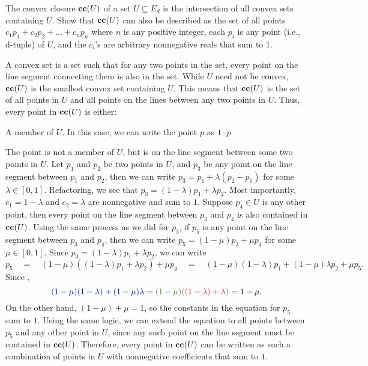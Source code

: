 \documentclass[11pt, reqno]{amsart}
\begin{document}
\newpage
\begin{problem}[15]
  The convex closure $\mathbf{cc}(U)$ of a set $U \subseteq E_d$
  is the intersection of all convex sets containing $U$. Show that $\mathbf{cc}(U)$
  can also be described as the set of all points $c_1 p_1 + c_2 p_2 + \ldots + c_n p_n$
  where $n$ is any positive integer, each $p_i$ is any point (i.e., d-tuple) of $U$,
  and the $c_i$'s are arbitrary nonnegative reals that sum to $1$.

  \step
  A convex set is a set such that for any two points in the set, every point on the line
  segment connecting them is also in the set.
  While $U$ need not be convex, $\mathbf{cc}(U)$ is the smallest convex set containing $U$.
  This means that $\mathbf{cc}(U)$ is the set of all points in $U$ and all points on the lines
  between any two points in $U$. Thus, every point in $\mathbf{cc}(U)$ is either:
  \begin{enumroman}
    \item A member of $U$. In this case, we can write the point $p$ as $1 \cdot p$.
    \item The point is not a member of $U$, but is on the line segment between some
      two points in $U$.
      Let $p_1$ and $p_2$ be two points in $U$, and $p_3$ be any point on the line segment
      between $p_1$ and $p_2$, then we can write $p_3 = p_1 + \lambda (p_2 - p_1)$ for some
      $\lambda \in [0,1]$.
      Refactoring, we see that $p_3 = (1 - \lambda) p_1 + \lambda p_2$. Most importantly,
      $c_1 = 1 - \lambda$ and $c_2 = \lambda$ are nonnegative and sum to $1$.
      Suppose $p_4 \in U$ is any other point, then every point on the line segment between
      $p_3$ and $p_4$ is also contained in $\mathbf{cc}(U)$. Using the same process as we did for $p_3$,
      if $p_5$ is any point on the line segment between $p_3$ and $p_4$, then we can write
      $p_5 = (1 - \mu) p_3 + \mu p_4$ for some $\mu \in [0,1]$. Since
      $p_3 = (1 - \lambda) p_1 + \lambda p_2$, we can write
      \[ p_5 \quad = 
        \quad (1 - \mu) ((1 - \lambda) p_1 + \lambda p_2) + \mu p_4 \quad =
        \quad (1 - \mu)(1 - \lambda) p_1 + (1 - \mu)\lambda p_2 + \mu p_5.
      \]
      Since ,
      \[ \zaff{(1 - \mu)(1 - \lambda) + (1 - \mu)\lambda} = \green{(1 - \mu)(\crim{(1 - \lambda) + \lambda})} = 1 - \mu. \]
      On the other hand, $(1 - \mu) + \mu = 1$, so the constants in the equation for $p_5$ sum to $1$.
      Using the same logic, we can extend the equation to all points between $p_5$ and any other point
      in $U$, since any such point on the line segment must be contained in $\mathbf{cc}(U)$.
      Therefore, every point in $\mathbf{cc}(U)$ can be written as such a combination of points in $U$
      with nonnegative coefficients that sum to $1$.
  \end{enumroman}
\end{problem}
\end{document}
